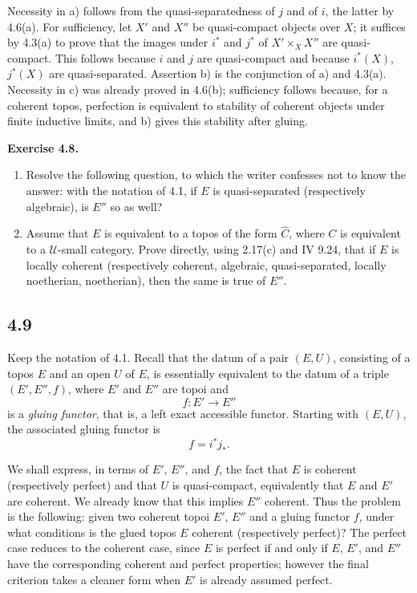 \documentclass[11pt]{article}
\newcommand{\U}{\mathcal{U}}
\newenvironment{remarktext}[1]{\par\medskip\noindent\textbf{#1.}\ }{\par\medskip}
\begin{document}
Necessity in a) follows from the quasi-separatedness of \(j\) and of \(i\), the latter by 4.6(a). For sufficiency, let \(X'\) and \(X''\) be quasi-compact objects over \(X\); it suffices by 4.3(a) to prove that the images under \(i^*\) and \(j^*\) of \(X'\times_X X''\) are quasi-compact. This follows because \(i\) and \(j\) are quasi-compact and because \(i^*(X)\), \(j^*(X)\) are quasi-separated. Assertion b) is the conjunction of a) and 4.3(a). Necessity in c) was already proved in 4.6(b); sufficiency follows because, for a coherent topos, perfection is equivalent to stability of coherent objects under finite inductive limits, and b) gives this stability after gluing.

\begin{remarktext}{Exercise 4.8}
\begin{enumerate}[label=\alph*)]
\item Resolve the following question, to which the writer confesses not to know the answer: with the notation of 4.1, if \(E\) is quasi-separated (respectively algebraic), is \(E''\) so as well?
\item Assume that \(E\) is equivalent to a topos of the form \(\widehat C\), where \(C\) is equivalent to a \(\U\)-small category. Prove directly, using 2.17(c) and IV 9.24, that if \(E\) is locally coherent (respectively coherent, algebraic, quasi-separated, locally noetherian, noetherian), then the same is true of \(E''\).
\end{enumerate}
\end{remarktext}

\subsection*{4.9}
Keep the notation of 4.1. Recall that the datum of a pair \((E,U)\), consisting of a topos \(E\) and an open \(U\) of \(E\), is essentially equivalent to the datum of a triple \((E',E'',f)\), where \(E'\) and \(E''\) are topoi and
\[
  f:E'\to E'' \tag{4.9.1}
\]
is a \emph{gluing functor}, that is, a left exact accessible functor. Starting with \((E,U)\), the associated gluing functor is
\[
  f=i^*j_* . \tag{4.9.2}
\]

We shall express, in terms of \(E'\), \(E''\), and \(f\), the fact that \(E\) is coherent (respectively perfect) and that \(U\) is quasi-compact, equivalently that \(E\) and \(E'\) are coherent. We already know that this implies \(E''\) coherent. Thus the problem is the following: given two coherent topoi \(E'\), \(E''\) and a gluing functor \(f\), under what conditions is the glued topos \(E\) coherent (respectively perfect)? The perfect case reduces to the coherent case, since \(E\) is perfect if and only if \(E\), \(E'\), and \(E''\) have the corresponding coherent and perfect properties; however the final criterion takes a cleaner form when \(E'\) is already assumed perfect.
\end{document}
